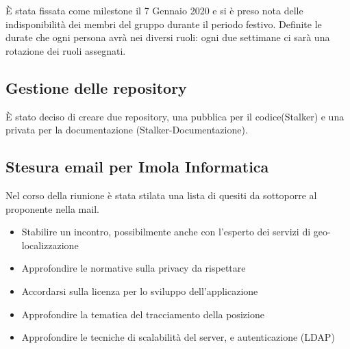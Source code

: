 \documentclass[a4paper, oneside, dvipsnames, table]{article}
\begin{document}
È stata fissata come milestone il 7 Gennaio 2020 e si è preso nota delle indisponibilità dei membri del gruppo durante il periodo festivo. 
Definite le durate che ogni persona avrà nei diversi ruoli: ogni due settimane ci sarà una rotazione dei ruoli assegnati. \\

\subsection{Gestione delle repository}
È stato deciso di creare due repository, una pubblica per il codice(Stalker) e una privata per la documentazione (Stalker-Documentazione).

\subsection{Stesura email per Imola Informatica}
Nel corso della riunione è stata stilata una lista di quesiti da sottoporre al proponente nella mail. 
\begin{itemize}
\item Stabilire un incontro, possibilmente anche con l’esperto dei servizi di geo-localizzazione
\item Approfondire le normative sulla privacy da rispettare
\item Accordarsi sulla licenza per lo sviluppo dell'applicazione
\item Approfondire la tematica del tracciamento della posizione
\item Approfondire le tecniche di scalabilità del server, e autenticazione (LDAP)


\end{itemize}
\end{document}
